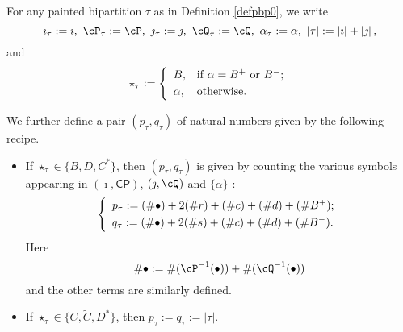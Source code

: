 \documentclass[12pt,a4paper]{amsart}
\def\abs#1{\left|{#1}\right|}
\newcommand{\CP}{{\mathcal {P}}}
\newcommand{\CQ}{{\mathcal {Q}}}
\numberwithin{equation}{section}
\theoremstyle{remark}
\newtheorem{remark}[thm]{Remark}
\def\CP{\mathsf{CP}}
\def\CQ{\overline{\sfA}}%
\begin{document}

For any painted bipartition $\tau$ as in Definition \ref{defpbp0}, we write
\[
  \imath_\tau:=\imath,\ \cP_\tau:=\cP,\ \jmath_\tau:=\jmath,\ \cQ_\tau:=\cQ,\ \alpha_\tau:=\alpha,\ \abs{\tau}:=\abs{\imath}+\abs{\jmath},
\]
and
\[
  \star_\tau:= \left\{
    \begin{array}{ll}
      B, &\hbox{if $\alpha=B^+$ or $B^-$}; \smallskip\\
      \alpha, & \hbox{otherwise}.           \end{array}
  \right.
\]

We further define a pair $(p_{\tau}, q_{\tau})$ of natural numbers given by the
following recipe.
\begin{itemize}
  \item If $\star_\tau\in \{B, D, C^*\}$, then $(p_\tau, q_\tau)$ is given by
        counting the various symbols appearing in $(\imath, \CP)$,
        $(\jmath, \cQ)$ and $\{\alpha\}$ :
        \begin{equation*}%
          \left\{
            \begin{array}{l}
              p_\tau :=( \# \bullet)+ 2 (\# r) +(\# c )+ (\# d) + (\# B^+);\smallskip\\
              q_\tau :=( \# \bullet)+ 2 (\# s) + (\# c) + (\# d) + (\# B^-).\\
            \end{array}
          \right.
        \end{equation*}
        Here
        \[
        \#\bullet:=\#(\cP^{-1}(\bullet))+\#(\cQ^{-1}(\bullet))
        \]
        and the other terms are similarly defined.
  \item If $\star_\tau\in \{C, \widetilde C, D^*\}$, then
        $p_\tau:=q_\tau:=\abs{\tau}$.
\end{itemize}
\smallskip
\end{document}
